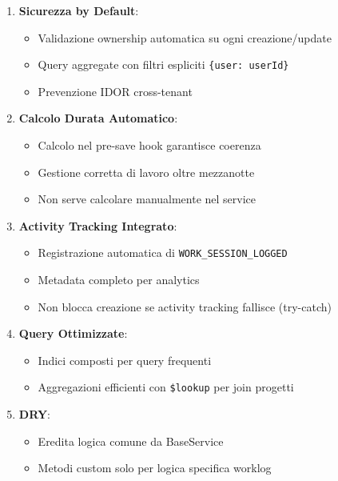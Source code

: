 \documentclass[11pt,a4paper]{article}
\begin{document}
\begin{enumerate}
    \item \textbf{Sicurezza by Default}:
    \begin{itemize}
        \item Validazione ownership automatica su ogni creazione/update
        \item Query aggregate con filtri espliciti \texttt{\{user: userId\}}
        \item Prevenzione IDOR cross-tenant
    \end{itemize}
    
    \item \textbf{Calcolo Durata Automatico}:
    \begin{itemize}
        \item Calcolo nel pre-save hook garantisce coerenza
        \item Gestione corretta di lavoro oltre mezzanotte
        \item Non serve calcolare manualmente nel service
    \end{itemize}
    
    \item \textbf{Activity Tracking Integrato}:
    \begin{itemize}
        \item Registrazione automatica di \texttt{WORK\_SESSION\_LOGGED}
        \item Metadata completo per analytics
        \item Non blocca creazione se activity tracking fallisce (try-catch)
    \end{itemize}
    
    \item \textbf{Query Ottimizzate}:
    \begin{itemize}
        \item Indici composti per query frequenti
        \item Aggregazioni efficienti con \texttt{\$lookup} per join progetti
    \end{itemize}
    
    \item \textbf{DRY}:
    \begin{itemize}
        \item Eredita logica comune da BaseService
        \item Metodi custom solo per logica specifica worklog
    \end{itemize}
\end{enumerate}
\end{document}
